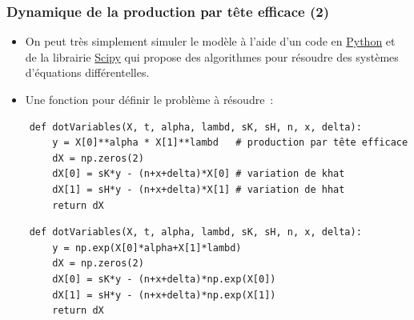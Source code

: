 \documentclass[10pt,notheorems]{beamer}
\theoremstyle{plain}
\theoremstyle{definition} %
\begin{document}
\begin{frame}[fragile]
  \frametitle{Dynamique de la production par tête efficace (2)}

  \begin{itemize}

  \item On peut très simplement simuler le modèle à l'aide d'un code en \href{https://www.python.org}{Python} et de la librairie \href{https://scipy.org}{Scipy} qui propose des algorithmes pour résoudre des systèmes d'équations différentelles.\newline

  \item Une fonction pour définir le problème à résoudre :\newline

  \end{itemize}

\begin{center}

  \begin{verbatim}
    def dotVariables(X, t, alpha, lambd, sK, sH, n, x, delta):
        y = X[0]**alpha * X[1]**lambd   # production par tête efficace
        dX = np.zeros(2)
        dX[0] = sK*y - (n+x+delta)*X[0] # variation de khat
        dX[1] = sH*y - (n+x+delta)*X[1] # variation de hhat
        return dX
  \end{verbatim}

  \bigskip

  \begin{verbatim}
    def dotVariables(X, t, alpha, lambd, sK, sH, n, x, delta):
        y = np.exp(X[0]*alpha+X[1]*lambd)
        dX = np.zeros(2)
        dX[0] = sK*y - (n+x+delta)*np.exp(X[0])
        dX[1] = sH*y - (n+x+delta)*np.exp(X[1])
        return dX
  \end{verbatim}

\end{center}

\end{frame}
\end{document}
